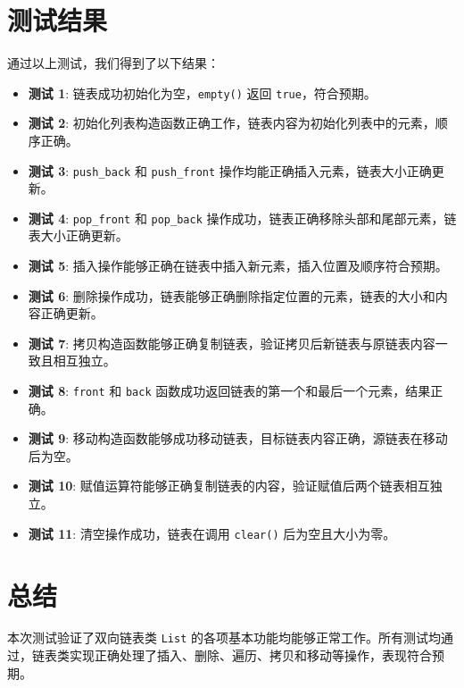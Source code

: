 \documentclass{article}
\begin{document}
\section{测试结果}
通过以上测试，我们得到了以下结果：
\begin{itemize}
    \item \textbf{测试 1}: 链表成功初始化为空，\texttt{empty()} 返回 \texttt{true}，符合预期。
    \item \textbf{测试 2}: 初始化列表构造函数正确工作，链表内容为初始化列表中的元素，顺序正确。
    \item \textbf{测试 3}: \texttt{push\_back} 和 \texttt{push\_front} 操作均能正确插入元素，链表大小正确更新。
    \item \textbf{测试 4}: \texttt{pop\_front} 和 \texttt{pop\_back} 操作成功，链表正确移除头部和尾部元素，链表大小正确更新。
    \item \textbf{测试 5}: 插入操作能够正确在链表中插入新元素，插入位置及顺序符合预期。
    \item \textbf{测试 6}: 删除操作成功，链表能够正确删除指定位置的元素，链表的大小和内容正确更新。
    \item \textbf{测试 7}: 拷贝构造函数能够正确复制链表，验证拷贝后新链表与原链表内容一致且相互独立。
    \item \textbf{测试 8}: \texttt{front} 和 \texttt{back} 函数成功返回链表的第一个和最后一个元素，结果正确。
    \item \textbf{测试 9}: 移动构造函数能够成功移动链表，目标链表内容正确，源链表在移动后为空。
    \item \textbf{测试 10}: 赋值运算符能够正确复制链表的内容，验证赋值后两个链表相互独立。
    \item \textbf{测试 11}: 清空操作成功，链表在调用 \texttt{clear()} 后为空且大小为零。
\end{itemize}

\section{总结}
本次测试验证了双向链表类 \texttt{List} 的各项基本功能均能够正常工作。所有测试均通过，链表类实现正确处理了插入、删除、遍历、拷贝和移动等操作，表现符合预期。
\end{document}
